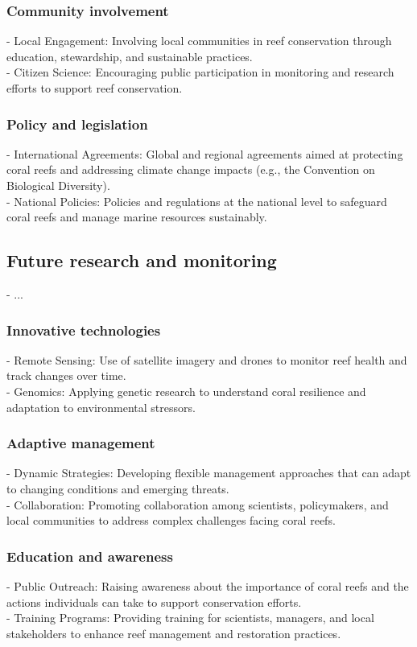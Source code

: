 \subsubsection{Community involvement}
- Local Engagement: Involving local communities in reef conservation through education, stewardship, and sustainable practices. \\
- Citizen Science: Encouraging public participation in monitoring and research efforts to support reef conservation. 
\subsubsection{Policy and legislation}
- International Agreements: Global and regional agreements aimed at protecting coral reefs and addressing climate change impacts (e.g., the Convention on Biological Diversity). \\
- National Policies: Policies and regulations at the national level to safeguard coral reefs and manage marine resources sustainably. 

\subsection{Future research and monitoring}
- ... 
\subsubsection{Innovative technologies}
- Remote Sensing: Use of satellite imagery and drones to monitor reef health and track changes over time. \\
- Genomics: Applying genetic research to understand coral resilience and adaptation to environmental stressors. 
\subsubsection{Adaptive management}
- Dynamic Strategies: Developing flexible management approaches that can adapt to changing conditions and emerging threats. \\
- Collaboration: Promoting collaboration among scientists, policymakers, and local communities to address complex challenges facing coral reefs.
\subsubsection{Education and awareness}
- Public Outreach: Raising awareness about the importance of coral reefs and the actions individuals can take to support conservation efforts. \\
- Training Programs: Providing training for scientists, managers, and local stakeholders to enhance reef management and restoration practices.



